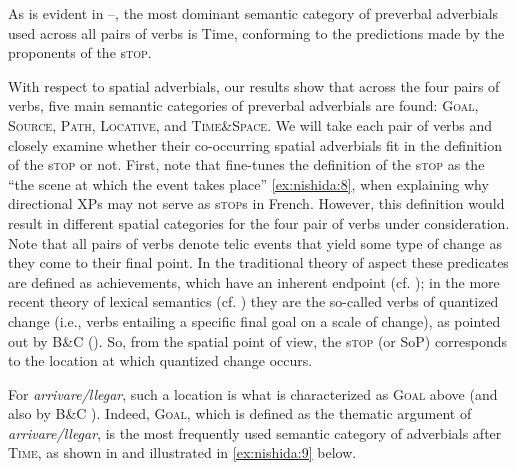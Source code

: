 \documentclass[output=paper,colorlinks,citecolor=brown,
]{langscibook}
\begin{document}
\begin{figure}

\begin{floatrow}
    \qquad
{}
\end{floatrow}
\end{figure}

\newpage
As is evident in --, the most dominant semantic category of preverbal adverbials used across all pairs of verbs is Time, conforming to the predictions made by the proponents of the s\textsc{top}.

With respect to spatial adverbials, our results show that across the four pairs of verbs, five main semantic categories of preverbal adverbials are found: \textsc{Goal, Source, Path, Locative}, and \textsc{Time\&Space}. We will take each pair of verbs and closely examine whether their co-occurring spatial adverbials fit in the definition of the s\textsc{top} or not. First, note that \citet{lahousse2007implicit} fine-tunes the definition of the s\textsc{top} as the ``the scene at which the event takes place'' \ref{ex:nishida:8}, when explaining why directional XPs may not serve as s\textsc{top}s  in French. However, this definition would result in different spatial categories for the four pair of verbs under consideration. Note that all pairs of verbs denote telic events that yield some type of change as they come to their final point. In the traditional theory of aspect these predicates are defined as achievements, which have an inherent endpoint (cf. \citealt{smith1997}); in the more recent theory of lexical semantics (cf. \citealt{beavers2011affectedness}) they are the so-called verbs of quantized change (i.e., verbs entailing a specific final goal on a scale of change), as pointed out by B\&C (\citeyear{bentley2018silent}). So, from the spatial point of view, the s\textsc{top} (or SoP) corresponds to the location at which quantized change occurs.  

For \textit{arrivare/llegar}, such a location is what is characterized as \textsc{Goal} above (and also by B\&C \citeyear{bentley2018silent}). Indeed, \textsc{Goal}, which is defined as the thematic argument of \textit{arrivare/llegar}, is the most frequently used semantic category of adverbials after \textsc{Time}, as shown in  and illustrated in \ref{ex:nishida:9} below.  
\end{document}
